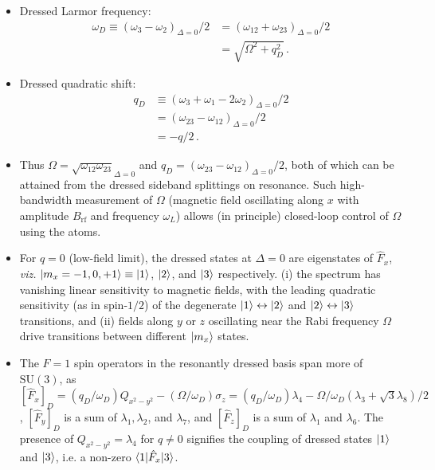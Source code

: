 \documentclass[aps,prl,reprint,superscriptaddress,floatfix]{revtex4-1}
\begin{document}
\begin{itemize}
    \item[\checkmark] Dressed Larmor frequency:
    \begin{align*}
        \omega_D \equiv (\omega_3 - \omega_2)_{\Delta=0}/2 &= (\omega_{12} + \omega_{23})_{\Delta=0}/2 \\ &= \sqrt{\Omega^2 + q_D^2}\, .
    \end{align*}
    \item[\checkmark] Dressed quadratic shift:
    \begin{align*}
        q_D &\equiv (\omega_3 + \omega_1 -2\omega_2)_{\Delta=0}/2 \\
            &= (\omega_{23}-\omega_{12})_{\Delta=0}/2\\ 
            &= -q/2 \, .
     \end{align*}
    \item Thus $\Omega = \sqrt{\omega_{12} \omega_{23}}_{\Delta=0}$ and $q_D = (\omega_{23} - \omega_{12})_{\Delta=0}/2$, both of which can be attained from the dressed sideband splittings on resonance.
    Such high-bandwidth measurement of $\Omega$ (magnetic field oscillating along $x$ with amplitude $B_{\text{rf}}$ and frequency $\omega_L$) allows (in principle) closed-loop control of $\Omega$ using the atoms.
    \item[\checkmark] For $q=0$ (low-field limit), the dressed states at $\Delta=0$ are eigenstates of $\hat{F}_x$, \textit{viz.} $\vert m_x=-1,0,+1 \rangle  \equiv \vert 1 \rangle $, $\vert 2 \rangle $, and $\vert 3 \rangle $ respectively.
    (i) the spectrum has vanishing linear sensitivity to magnetic fields, with the leading quadratic sensitivity (as in spin-$1/2$) of the degenerate $\vert 1 \rangle  \leftrightarrow \vert 2 \rangle $ and $\vert 2 \rangle  \leftrightarrow \vert 3 \rangle $ transitions, and (ii) fields along $y$ or $z$ oscillating near the Rabi frequency $\Omega$ drive transitions between different $\vert m_x \rangle $ states. 
    \item[\checkmark] The $F=1$ spin operators in the resonantly dressed basis span more of $\text{SU}(3)$, as $[\hat{F}_x]_D = (q_D/\omega_D) Q_{x^2-y^2} - (\Omega / \omega_D) \sigma_z = (q_D/\omega_D) \lambda_4 - \Omega / \omega_D ( \lambda_3 +\sqrt{3} \lambda_8) / 2$, $[\hat{F}_y]_D$ is a sum of $\lambda_1, \lambda_2$, and $\lambda_7$, and  $[\hat{F}_z]_D$ is a sum of $\lambda_1$ and $\lambda_6$.
    The presence of $Q_{x^2-y^2} = \lambda_4$ for $q \neq 0$ signifies the coupling of dressed states $\vert 1 \rangle $ and $\vert 3 \rangle $, i.e. a non-zero $\langle 1 \vert  \hat{F}_x \vert 3 \rangle $.

\end{itemize}
\end{document}
